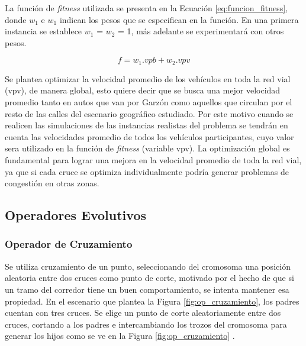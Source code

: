 La función de \emph{fitness} utilizada se presenta en la Ecuación \ref{eq:funcion_fitness}, donde \emph{$w_1$} e \emph{$w_1$} indican los pesos que se especifican en la función. En una primera instancia se establece $w_1$ = $w_2$ = 1, más adelante se experimentará con otros pesos.

\begin{equation}
\label{eq:funcion_fitness}
f = w_1.vpb + w_2.vpv
\end{equation}



Se plantea optimizar la velocidad promedio de los vehículos en toda la red vial (vpv), de manera global, esto quiere decir que se busca una mejor velocidad promedio tanto en autos que van por Garzón como aquellos que circulan por el resto de las calles del escenario geográfico estudiado. Por este motivo cuando se realicen las simulaciones de las instancias realistas del problema se tendrán en cuenta las velocidades promedio de todos los vehículos participantes, cuyo valor sera utilizado en la función de \emph{fitness} (variable vpv). La optimización global es fundamental para lograr una mejora en la velocidad promedio de toda la red vial, ya que si cada cruce se optimiza individualmente podría generar problemas de congestión en otras zonas.

\subsection{Operadores Evolutivos}

\subsubsection{Operador de Cruzamiento}
Se utiliza cruzamiento de un punto, seleccionando del cromosoma una posición aleatoria entre dos cruces como punto de corte, motivado por el hecho de que si un tramo del corredor tiene un buen comportamiento, se intenta mantener esa propiedad. En el escenario que plantea la Figura \ref{fig:op_cruzamiento}, los padres cuentan con tres cruces. Se elige un punto de corte aleatoriamente entre dos cruces, cortando a los padres e intercambiando los trozos del cromosoma para generar los hijos como se ve en la Figura \ref{fig:op_cruzamiento} .


